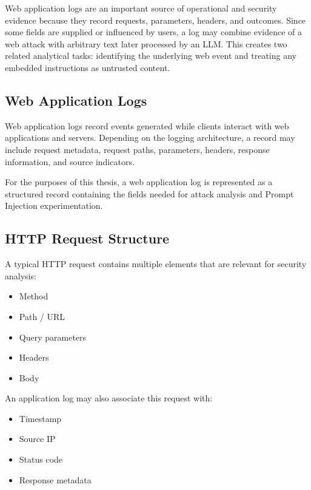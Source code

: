 Web application logs are an important source of operational and security
evidence because they record requests, parameters, headers, and outcomes.
Since some fields are supplied or influenced by users, a log may combine
evidence of a web attack with arbitrary text later processed by an LLM.
This creates two related analytical tasks: identifying the underlying
web event and treating any embedded instructions as untrusted content.

\subsection{Web Application Logs}\label{web-application-logs}

Web application logs record events generated while clients interact with
web applications and servers. Depending on the logging architecture, a
record may include request metadata, request paths, parameters, headers,
response information, and source indicators.

For the purposes of this thesis, a web application log is represented as
a structured record containing the fields needed for attack analysis and
Prompt Injection experimentation.

\subsection{HTTP Request Structure}\label{http-request-structure}

A typical HTTP request contains multiple elements that are relevant for
security analysis:

\begin{itemize}
\tightlist
\item
  Method
\item
  Path / URL
\item
  Query parameters
\item
  Headers
\item
  Body
\end{itemize}

An application log may also associate this request with:

\begin{itemize}
\tightlist
\item
  Timestamp
\item
  Source IP
\item
  Status code
\item
  Response metadata
\end{itemize}

